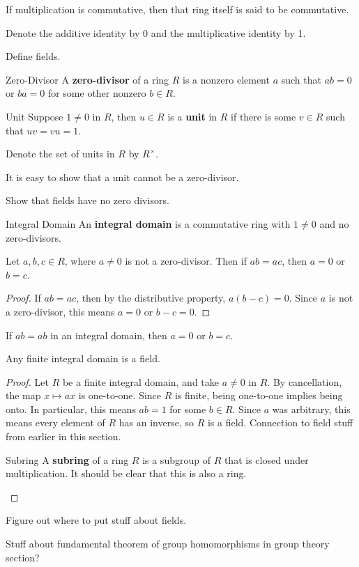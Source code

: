 \documentclass[10pt]{report}
\begin{document}
If multiplication is commutative, then that ring itself is said to be commutative.

Denote the additive identity by 0 and the multiplicative identity by 1.

{\color{red}Define fields.}

\begin{defn}{Zero-Divisor}{}
A \textbf{zero-divisor} of a ring $R$ is a nonzero element $a$ such that $ab=0$ or $ba=0$ for some other nonzero $b \in R$.
\end{defn}

\begin{defn}{Unit}{}
Suppose $1 \neq 0$ in $R$, then $u \in R$ is a \textbf{unit} in $R$ if there is some $v \in R$ such that $uv=vu=1$.

Denote the set of units in $R$ by $R^{\times}$.
\end{defn}

It is easy to show that a unit cannot be a zero-divisor.

{\color{red}Show that fields have no zero divisors.}

\begin{defn}{Integral Domain}{}
An \textbf{integral domain} is a commutative ring with $1 \neq 0$ and no zero-divisors.
\end{defn}

\begin{prop}
Let $a,b,c \in R$, where $ a \neq 0$ is not a zero-divisor. Then if $ab=ac$, then $a=0$ or $b=c$.
\end{prop}
\begin{proof}
	If $ab=ac$, then by the distributive property, $a(b-c)=0$. Since $a$ is not a zero-divisor, this means $a=0$ or $b-c=0$.
\end{proof}

\begin{cor}
If $ab=ab$ in an integral domain, then $a=0$ or $b=c$.
\end{cor}

\begin{cor}
	Any finite integral domain is a field.
\end{cor}
\begin{proof}
	Let $R$ be a finite integral domain, and take $a \neq 0$ in $R$. By cancellation, the map $x \mapsto ax$ is one-to-one. Since $R$ is finite, being one-to-one implies being onto. In particular, this means $ab=1$ for some $b \in R$. Since $a$ was arbitrary, this means every element of $R$ has an inverse, so $R$ is a field. {\color{red}Connection to field stuff from earlier in this section.}

\begin{defn}{Subring}{}
A \textbf{subring} of a ring $R$ is a subgroup of $R$ that is closed under multiplication. It should be clear that this is also a ring.
\end{defn}
\end{proof}

{\color{red}Figure out where to put stuff about fields.}

{\color{red}Stuff about fundamental theorem of group homomorphisms in group theory section?}
\end{document}

